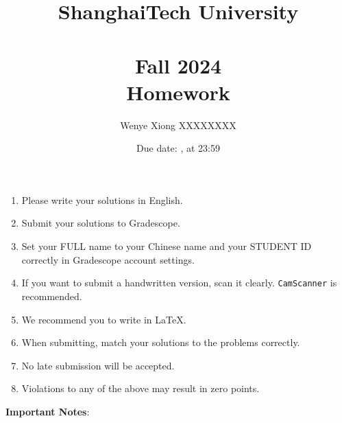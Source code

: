 \documentclass[11pt, addpoints, answers]{exam}
\title{
    \vspace{25pt}
    \LARGE ShanghaiTech University \\
    \bigskip
    \textbf{\CourseName} \\
    \textbf{Fall 2024}   \\
    \bigskip
    Homework \HomeworkNO
}
\author{Wenye Xiong XXXXXXXX}
\date{Due date: \DueDate, at 23:59}
\newcommand{\ttt}{\texttt}
\begin{document}
\maketitle

\vspace{50pt}

\begin{enumerate}
    \item Please write your solutions in English.
    \item Submit your solutions to Gradescope.
    \item Set your FULL name to your Chinese name and your STUDENT ID correctly in Gradescope account settings.
    \item If you want to submit a handwritten version, scan it clearly. \ttt{CamScanner} is recommended.
    \item We recommend you to write in LaTeX.
    \item When submitting, match your solutions to the problems correctly.
    \item No late submission will be accepted.
    \item Violations to any of the above may result in zero points.
\end{enumerate}

\newpage


{\large\textbf{Important Notes}:}
\end{document}
